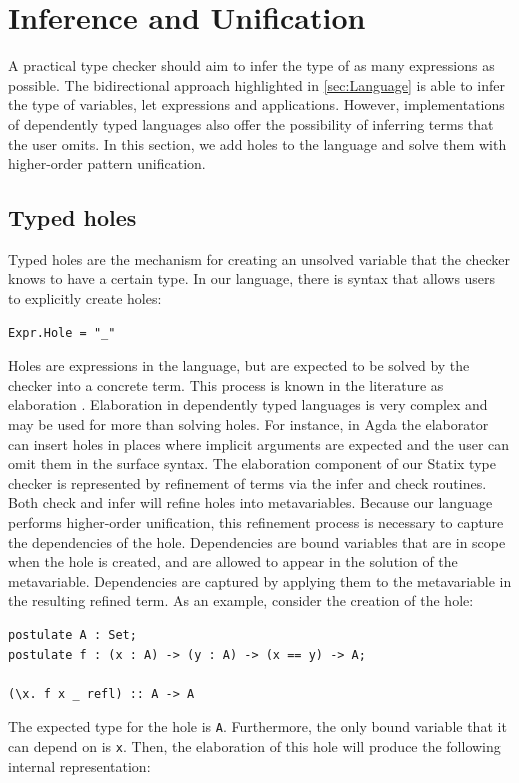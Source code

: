 \section{\label{sec:Inference}Inference and Unification}
A practical type checker should aim to infer the type of as many expressions as possible. The bidirectional approach highlighted in \cref{sec:Language} is able to infer the type of variables, let expressions and applications. However, implementations of dependently typed languages also offer the possibility of inferring terms that the user omits. In this section, we add holes to the
language and solve them with higher-order pattern unification.

\subsection{Typed holes}
Typed holes are the mechanism for creating an unsolved variable that the checker knows to have a certain type. In our language, there is syntax that allows users to explicitly create holes:
\begin{lstlisting}[language=SDF3]
Expr.Hole = "_"
\end{lstlisting}
Holes are expressions in the language, but are expected to be solved by the checker into a concrete term. This process is known in the literature as elaboration \autocite{demoura2015elaboration}. Elaboration in dependently typed languages is very complex and may be used for more than solving holes. For instance, in Agda the elaborator can insert holes in places where implicit arguments are expected and the user can omit them in the surface syntax. The elaboration component of our Statix type checker is represented by refinement of terms via the infer and check routines. Both check and infer will refine holes into metavariables. Because our language performs higher-order unification, this refinement process is necessary to capture the dependencies of the hole. Dependencies are bound variables that are in scope when the hole is created, and are allowed to appear in the solution of the metavariable. Dependencies are captured by applying them to the metavariable in the resulting refined term. As an example, consider the creation of the hole: 
\begin{lstlisting}
postulate A : Set;
postulate f : (x : A) -> (y : A) -> (x == y) -> A;

(\x. f x _ refl) :: A -> A
\end{lstlisting} 
The expected type for the hole is \texttt{A}. Furthermore, the only bound variable that it can depend on is \texttt{x}. Then, the elaboration of this hole will produce the following internal representation:
